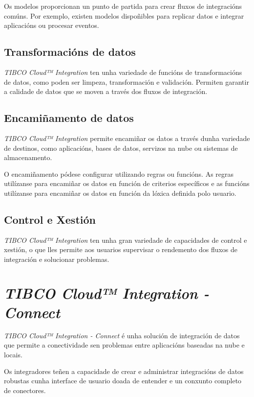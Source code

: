 Os modelos proporcionan un punto de partida para crear fluxos de integracións comúns. Por exemplo, existen modelos dispoñibles para replicar datos e integrar aplicacións ou procesar eventos.

\subsection{Transformacións de datos}

\textit{TIBCO Cloud™ Integration} ten unha variedade de funcións de transformacións de datos, como poden ser limpeza, transformación e validación. Permiten garantir a calidade de datos que se moven a través dos fluxos de integración.

\subsection{Encamiñamento de datos}

\textit{TIBCO Cloud™ Integration} permite encamiñar os datos a través dunha variedade de destinos, como aplicacións, bases de datos, servizos na nube ou sistemas de almacenamento.

O encamiñamento pódese configurar utilizando regras ou funcións. As regras utilízanse para encamiñar os datos en función de criterios específicos e as funcións utilízanse para encamiñar os datos en función da lóxica definida polo usuario.

\subsection{Control e Xestión}

\textit{TIBCO Cloud™ Integration} ten unha gran variedade de capacidades de control e xestión, o que lles permite aos usuarios supervisar o rendemento dos fluxos de integración e solucionar problemas.

\section{\textit{TIBCO Cloud™ Integration - Connect}}

\textit{TIBCO Cloud™ Integration - Connect} é  unha solución de integración de datos que permite a conectividade sen problemas entre aplicacións baseadas na nube e locais.

Os integradores teñen a capacidade de crear e administrar integracións de datos robustas cunha interface de usuario doada de entender e un conxunto completo de conectores.

